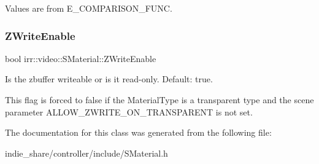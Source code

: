Values are from E\+\_\+\+C\+O\+M\+P\+A\+R\+I\+S\+O\+N\+\_\+\+F\+U\+NC. \mbox{\label{classirr_1_1video_1_1SMaterial_a0e6b40e87162a74f2c730af597e20721}} 
\subsubsection{\texorpdfstring{Z\+Write\+Enable}{ZWriteEnable}}
{\footnotesize\ttfamily bool irr\+::video\+::\+S\+Material\+::\+Z\+Write\+Enable}



Is the zbuffer writeable or is it read-\/only. Default\+: true. 

This flag is forced to false if the Material\+Type is a transparent type and the scene parameter A\+L\+L\+O\+W\+\_\+\+Z\+W\+R\+I\+T\+E\+\_\+\+O\+N\+\_\+\+T\+R\+A\+N\+S\+P\+A\+R\+E\+NT is not set. 

The documentation for this class was generated from the following file\+:\begin{DoxyCompactItemize}
\item 
indie\+\_\+share/controller/include/S\+Material.\+h\end{DoxyCompactItemize}
